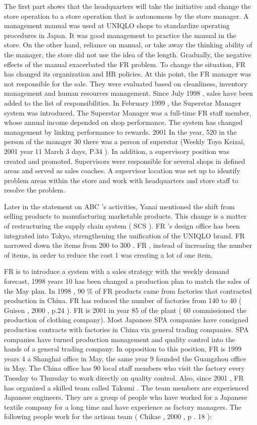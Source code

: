 \documentclass[12pt,]{article}
\begin{document}
The first part shows that the headquarters will take the initiative and
change the store operation to a store operation that is autonomous by
the store manager. A management manual was used at UNIQLO shops to
standardize operating procedures in Japan. It was good management to
practice the manual in the store. On the other hand, reliance on manual,
or take away the thinking ability of the manager, the store did not use
the idea of the length. Gradually, the negative effects of the manual
exacerbated the FR problem. To change the situation, FR has changed its
organization and HR policies. At this point, the FR manager was not
responsible for the sale. They were evaluated based on cleanliness,
inventory management and human resources management. Since July 1998 ,
sales have been added to the list of responsibilities. In February 1999
, the Superstar Manager system was introduced. The Superstar Manager was
a full-time FR staff member, whose annual income depended on shop
performance. The system has changed management by linking performance to
rewards. 2001 In the year, 520 in the person of the manager 30 there was
a person of superstar (Weekly Toyo Keizai, 2001 year 11 March 3 days,
P.34 ). In addition, a supervisory position was created and promoted.
Supervisors were responsible for several shops in defined areas and
served as sales coaches. A supervisor location was set up to identify
problem areas within the store and work with headquarters and store
staff to resolve the problem.

Later in the statement on ABC 's activities, Yanai mentioned the shift
from selling products to manufacturing marketable products. This change
is a matter of restructuring the supply chain system ( SCS ). FR 's
design office has been integrated into Tokyo, strengthening the
unification of the UNIQLO brand. FR narrowed down the items from 200 to
300 . FR , instead of increasing the number of items, in order to reduce
the cost 1 was creating a lot of one item.

FR is to introduce a system with a sales strategy with the weekly demand
forecast, 1998 years 10 has been changed a production plan to match the
sales of the May plan. In 1998 , 90 \% of FR products came from
factories that contracted production in China. FR has reduced the number
of factories from 140 to 40 ( Guisen , 2000 , p.24 ). FR is 2001 in year
85 of the plant ( 60 commissioned the production of clothing company).
Most Japanese SPA companies have consigned production contracts with
factories in China via general trading companies. SPA companies have
turned production management and quality control into the hands of a
general trading company. In opposition to this position, FR is 1999
years 4 a Shanghai office in May, the same year 9 founded the Guangzhou
office in May. The China office has 90 local staff members who visit the
factory every Tuesday to Thursday to work directly on quality control.
Also, since 2001 , FR has organized a skilled team called Takumi . The
team members are experienced Japanese engineers. They are a group of
people who have worked for a Japanese textile company for a long time
and have experience as factory managers. The following people work for
the artisan team ( Chikae , 2000 , p . 18 ):
\end{document}
